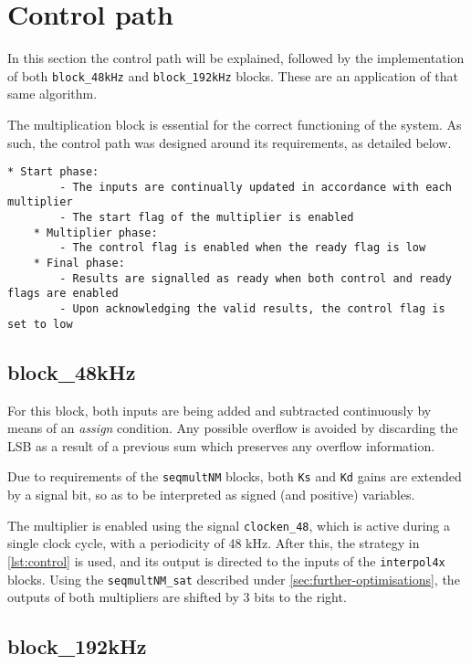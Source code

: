 \section{Control path}\label{sec:control-path}

In this section the control path will be explained, followed by the implementation of both \texttt{block\_48kHz} and \texttt{block\_192kHz} blocks. These are an application of that same algorithm.

The multiplication block is essential for the correct functioning of the system. As such, the control path was designed around its requirements, as detailed below.

\begin{lstlisting}[caption={Description of the control path}, label={lst:control}]
	* Start phase:
		- The inputs are continually updated in accordance with each multiplier
		- The start flag of the multiplier is enabled
	* Multiplier phase:
		- The control flag is enabled when the ready flag is low
	* Final phase:
		- Results are signalled as ready when both control and ready flags are enabled
		- Upon acknowledging the valid results, the control flag is set to low
\end{lstlisting}

\subsection{block\_48kHz}

For this block, both inputs are being added and subtracted continuously by means of an \emph{assign} condition. Any possible overflow is avoided by discarding the LSB as a result of a previous sum which preserves any overflow information.

Due to requirements of the \texttt{seqmultNM} blocks, both \texttt{Ks} and \texttt{Kd} gains are extended by a signal bit, so as to be interpreted as signed (and positive) variables.

The multiplier is enabled using the signal \texttt{clocken\_48}, which is active during a single clock cycle, with a periodicity of 48 kHz. After this, the strategy in \autoref{lst:control} is used, and its output is directed to the inputs of the \texttt{interpol4x} blocks. Using the \texttt{seqmultNM\_sat} described under \autoref{sec:further-optimisations}, the outputs of both multipliers are shifted by 3 bits to the right.

\subsection{block\_192kHz}


